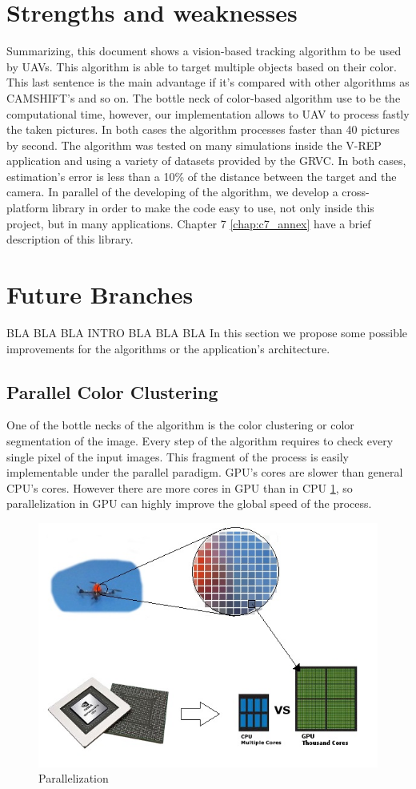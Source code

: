 \section{Strengths and weaknesses}
	Summarizing, this document shows a vision-based tracking algorithm to be used by UAVs. This algorithm is able to target multiple objects based on their color. This last sentence is the main advantage if it's compared with other algorithms as CAMSHIFT's \cite{blablacam} and so on. The bottle neck of color-based algorithm use to be the computational time, however, our implementation allows to UAV to process fastly the taken pictures. In both cases the algorithm processes faster than 40 pictures by second.
	The algorithm was tested on many simulations inside the V-REP application and using a variety of datasets provided by the GRVC. In both cases, estimation's error is less than a 10\% of the distance between the target and the camera.
	In parallel of the developing of the algorithm, we develop a cross-platform library in order to make the code easy to use, not only inside this project, but in many applications. Chapter 7 \ref{chap:c7_annex} have a brief description of this library.
	
	
\section{Future Branches}
	BLA BLA BLA INTRO BLA BLA BLA
	In this section we propose some possible improvements for the algorithms or the application's architecture.
	
	\subsection{Parallel Color Clustering}
	One of the bottle necks of the algorithm is the color clustering or color segmentation of the image. Every step of the algorithm requires to check every single pixel of the input images. This fragment of the process is easily implementable under the parallel paradigm.
	GPU's cores are slower than general CPU's cores. However there are more cores in GPU than in CPU \ref{fig:gpu}, so parallelization in GPU can highly improve the global speed of the process.
	
		
	\begin{figure}[ph]
		\centering
		\includegraphics[width=0.7\linewidth]{../Images/c5/gpu}
		\caption{Parallelization}
		\label{fig:gpu}
	\end{figure}



